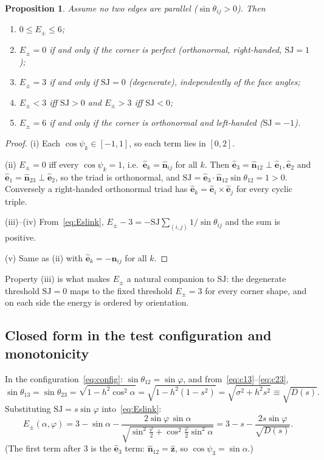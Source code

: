 \documentclass[11pt]{article}
\newtheorem{proposition}{Proposition}
\theoremstyle{definition}
\theoremstyle{remark}
\newcommand{\uv}[1]{\hat{\bm{#1}}}
\newcommand{\Es}{E_{\pm}}
\newcommand{\SJ}{\mathrm{SJ}}
\begin{document}
\begin{proposition}\label{prop:Esprops}
Assume no two edges are parallel ($\sin\theta_{ij}>0$). Then
\begin{enumerate}[label=(\roman*)]
  \item $0\le\Es\le6$;
  \item $\Es=0$ if and only if the corner is perfect (orthonormal, right-handed, $\SJ=1$);
  \item $\Es=3$ if and only if $\SJ=0$ (degenerate), independently of the face angles;
  \item $\Es<3$ iff $\SJ>0$ and $\Es>3$ iff $\SJ<0$;
  \item $\Es=6$ if and only if the corner is orthonormal and left-handed ($\SJ=-1$).
\end{enumerate}
\end{proposition}
\begin{proof}
(i) Each $\cos\psi_k\in[-1,1]$, so each term lies in $[0,2]$.

(ii) $\Es=0$ iff every $\cos\psi_k=1$, i.e.\ $\uv{e}_k=\uv{n}_{ij}$ for all $k$. Then
$\uv{e}_3=\uv{n}_{12}\perp\uv{e}_1,\uv{e}_2$ and $\uv{e}_1=\uv{n}_{23}\perp\uv{e}_2$, so the triad is
orthonormal, and $\SJ=\uv{e}_3\cdot\uv{n}_{12}\sin\theta_{12}=1>0$. Conversely a right-handed
orthonormal triad has $\uv{e}_k=\uv{e}_i\times\uv{e}_j$ for every cyclic triple.

(iii)--(iv) From~\eqref{eq:Eslink}, $\Es-3=-\SJ\sum_{(i,j)}1/\sin\theta_{ij}$ and the sum is positive.

(v) Same as (ii) with $\uv{e}_k=-\uv{n}_{ij}$ for all $k$.
\end{proof}

Property (iii) is what makes $\Es$ a natural companion to $\SJ$: the degenerate threshold
$\SJ=0$ maps to the fixed threshold $\Es=3$ for every corner shape, and on each side the energy
is ordered by orientation.

\subsection{Closed form in the test configuration and monotonicity}

In the configuration~\eqref{eq:config}: $\sin\theta_{12}=\sin\varphi$, and from~\eqref{eq:c13}--\eqref{eq:c23},
\begin{equation}
  \sin\theta_{13}=\sin\theta_{23}=\sqrt{1-h^2\cos^2\alpha}=\sqrt{1-h^2(1-s^2)}=\sqrt{\sigma^2+h^2s^2}
  \equiv\sqrt{D(s)}.
\end{equation}
Substituting $\SJ=s\sin\varphi$ into~\eqref{eq:Eslink}:
\begin{equation}
  \boxed{\Es(\alpha,\varphi)=3-\sin\alpha-\frac{2\sin\varphi\,\sin\alpha}{\sqrt{\sin^2\frac{\varphi}{2}+\cos^2\frac{\varphi}{2}\sin^2\alpha}}
  =3-s-\frac{2s\sin\varphi}{\sqrt{D(s)}}.}
  \label{eq:Esconfig}
\end{equation}
(The first term after $3$ is the $\uv{e}_3$ term: $\uv{n}_{12}=\uv{z}$, so $\cos\psi_3=\sin\alpha$.)
\end{document}
